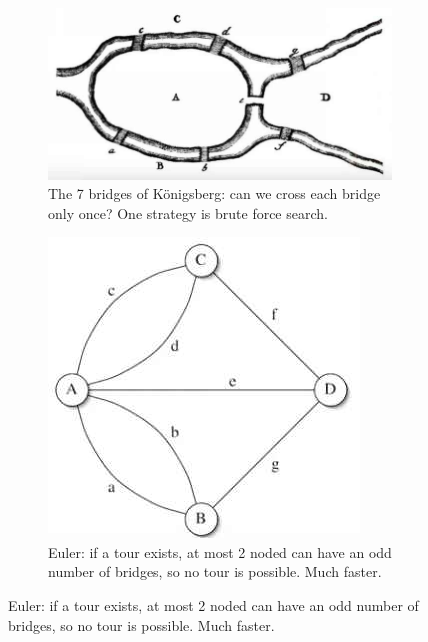 \documentclass[]{article}
\begin{document}
\begin{figure}[H]
	\caption{Eulerian paths}
	\begin{subfigure}[t]{0.54\textwidth}
		\caption{The 7 bridges of K\"onigsberg: can we cross each bridge only once? One strategy is brute force search.}
		\includegraphics[width=\textwidth]{euler}
	\end{subfigure}
	\begin{subfigure}[t]{0.54\textwidth}
		\caption{Euler: if a tour exists, at most 2 noded can have an odd number of bridges, so no tour is possible. Much faster.}
		\includegraphics[width=\textwidth]{euler2}
	\end{subfigure}
\end{figure}
\end{document}
